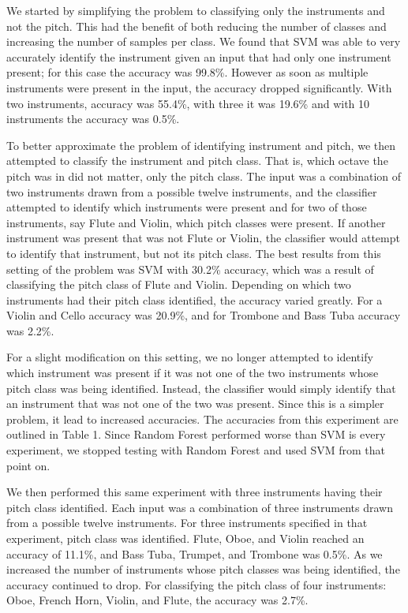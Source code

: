 \documentclass{article}
\begin{document}
We started by simplifying the problem to classifying only the instruments and not the pitch. This had the benefit of both reducing the number of classes and increasing the number of samples per class. We found that SVM was able to very accurately identify the instrument given an input that had only one instrument present; for this case the accuracy was 99.8\%. However as soon as multiple instruments were present in the input, the accuracy dropped significantly. With two instruments, accuracy was 55.4\%, with three it was 19.6\% and with 10 instruments the accuracy was 0.5\%. 

To better approximate the problem of identifying instrument and pitch, we then attempted to classify the instrument and pitch class. That is, which octave the pitch was in did not matter, only the pitch class. The input was a combination of two instruments drawn from a possible twelve instruments, and the classifier attempted to identify which instruments were present and for two of those instruments, say Flute and Violin, which pitch classes were present. If another instrument was present that was not Flute or Violin, the classifier would attempt to identify that instrument, but not its pitch class. The best results from this setting of the problem was SVM with 30.2\% accuracy, which was a result of classifying the pitch class of Flute and Violin. Depending on which two instruments had their pitch class identified, the accuracy varied greatly. For a Violin and Cello accuracy was 20.9\%, and for Trombone and Bass Tuba accuracy was 2.2\%.

For a slight modification on this setting, we no longer attempted to identify which instrument was present if it was not one of the two instruments whose pitch class was being identified. Instead, the classifier would simply identify that an instrument that was not one of the two was present. Since this is a simpler problem, it lead to increased accuracies. The accuracies from this experiment are outlined in Table 1. Since Random Forest performed worse than SVM is every experiment, we stopped testing with Random Forest and used SVM from that point on.

We then performed this same experiment with three instruments having their pitch class identified. Each input was a combination of three instruments drawn from a possible twelve instruments. For three instruments specified in that experiment, pitch class was identified. Flute, Oboe, and Violin reached an accuracy of 11.1\%, and Bass Tuba, Trumpet, and Trombone was 0.5\%. As we increased the number of instruments whose pitch classes was being identified, the accuracy continued to drop. For classifying the pitch class of four instruments: Oboe, French Horn, Violin, and Flute, the accuracy was 2.7\%.
\end{document}
